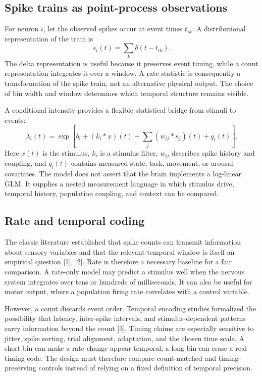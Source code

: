 \documentclass[conference]{IEEEtran}
\begin{document}
\subsection{Spike trains as point-process observations}
For neuron $i$, let the observed spikes occur at event times $t_{ik}$. A distributional representation of the train is
\begin{equation}
s_i(t)=\sum_k\delta(t-t_{ik}).
\end{equation}
The delta representation is useful because it preserves event timing, while a count representation integrates it over a window. A rate statistic is consequently a transformation of the spike train, not an alternative physical output. The choice of bin width and window determines which temporal structure remains visible.

A conditional intensity provides a flexible statistical bridge from stimuli to events:
\begin{equation}
\lambda_i(t)=\exp\left[b_i+(k_i*x)(t)+\sum_j(w_{ij}*s_j)(t)+q_i(t)\right].
\end{equation}
Here $x(t)$ is the stimulus, $k_i$ is a stimulus filter, $w_{ij}$ describes spike history and coupling, and $q_i(t)$ contains measured state, task, movement, or arousal covariates. The model does not assert that the brain implements a log-linear GLM. It supplies a nested measurement language in which stimulus drive, temporal history, population coupling, and context can be compared.

\subsection{Rate and temporal coding}
The classic literature established that spike counts can transmit information about sensory variables and that the relevant temporal window is itself an empirical question [1], [2]. Rate is therefore a necessary baseline for a fair comparison. A rate-only model may predict a stimulus well when the nervous system integrates over tens or hundreds of milliseconds. It can also be useful for motor output, where a population firing rate correlates with a control variable.

However, a count discards event order. Temporal encoding studies formalized the possibility that latency, inter-spike intervals, and stimulus-dependent patterns carry information beyond the count [3]. Timing claims are especially sensitive to jitter, spike sorting, trial alignment, adaptation, and the chosen time scale. A short bin can make a rate change appear temporal; a long bin can erase a real timing code. The design must therefore compare count-matched and timing-preserving controls instead of relying on a fixed definition of temporal precision.
\end{document}

